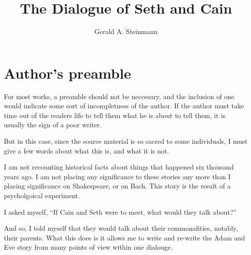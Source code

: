 \documentclass[12pt,twoside,titlepage]{report}
\title{The Dialogue of Seth and Cain}
\author{Gerald A. Steinmann}
\date{}
\begin{document}
\maketitle


%
%
%
\newcommand{\MyChapterText}[1]{
                \thechapter
                :
        #1
}
\newcommand{\mychapter}[1]{
    \clearpage
    \thispagestyle{plain}
    \vspace*{20pt}
    {   \normalfont
        \Huge
        \bfseries
        \refstepcounter{chapter}
        \addcontentsline{toc}{chapter}{\protect\MyChapterText{#1}}
        \MyChapterText{#1}
    }
}

\renewcommand{\chapter}[2]{
    \secdef\mychapter{{#1}}\mychapter{{#2}}
}


{
\setcounter{tocdepth}{2}
\tableofcontents
}
\hypertarget{authors-preamble}{%
\section{Author's preamble}\label{authors-preamble}}

For most works, a preamble should not be neccesary, and the inclusion of
one would indicate some sort of incompletness of the author. If the
author must take time out of the readers life to tell them what he is
about to tell them, it is usually the sign of a poor writer.

But in this case, since the source material is so sacred to some
individuals, I must give a few words about what this is, and what it is
not.

I am not recounting historical facts about things that happened six
thousand years ago. I am not placing any significance to these stories
any more than I placing significance on Shakespeare, or on Bach. This
story is the result of a psycholgoical experiment.

I asked myself, ``If Cain and Seth were to meet, what would they talk
about?''

And so, I told myself that they would talk about their commonalities,
notably, their parents. What this does is it allows me to write and
re-write the Adam and Eve story from many points of view within one
dialouge.
\end{document}
